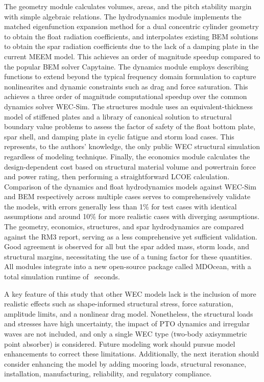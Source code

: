 \documentclass[preprint,12pt]{elsarticle}
\begin{document}
The geometry module calculates volumes, areas, and the pitch stability margin with simple algebraic relations.
The hydrodynamics module implements the matched eigenfunction expansion method for a dual concentric cylinder geometry to obtain the float radiation coefficients, and interpolates existing BEM solutions to obtain the spar radiation coefficients due to the lack of a damping plate in the current MEEM model.
This achieves an order of magnitude speedup compared to the popular BEM solver Capytaine.
The dynamics module employs describing functions to extend beyond the typical frequency domain formulation to capture nonlinearites and dynamic constraints such as drag and force saturation.
This achieves a three order of magnitude computational speedup over the common dynamics solver WEC-Sim.
The structures module uses an equivalent-thickness model of stiffened plates and a library of canonical solution to structural boundary value problems to assess the factor of safety of the float bottom plate, spar shell, and damping plate in cyclic fatigue and storm load cases.
This represents, to the authors' knowledge, the only public WEC structural simulation regardless of modeling technique.
Finally, the economics module calculates the design-dependent cost based on structural material volume and powertrain force and power rating, then performing a straightforward LCOE calculation.
Comparison of the dynamics and float hydrodynamics models against WEC-Sim and BEM respectively across multiple cases serves to comprehensively validate the models, with errors generally less than 1\% for test cases with identical assumptions and around 10\% for more realistic cases with diverging assumptions.
The geometry, economics, structures, and spar hydrodynamics are compared against the RM3 report, serving as a less comprehensive yet sufficient validation.
Good agreement is observed for all but the spar added mass, storm loads, and structural margins, necessitating the use of a tuning factor for these quantities.
All modules integrate into a new open-source package called MDOcean, with a total simulation runtime of \simRuntime~seconds.

A key feature of this study that other WEC models lack is the inclusion of more realistic effects such as shape-informed structural stress, force saturation, amplitude limits, and a nonlinear drag model.
Nonetheless, the structural loads and stresses have high uncertainty, the impact of PTO dynamics and irregular waves are not included, and only a single WEC type (two-body axisymmetric point absorber) is considered.
Future modeling work should pursue model enhancements to correct these limitations.
Additionally, the next iteration should consider enhancing the model by adding mooring loads, structural resonance, installation, manufacturing, reliability, and regulatory compliance. 
\end{document}
